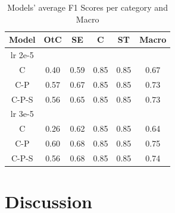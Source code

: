 \documentclass[11pt]{article}
\begin{document}

\begin{table}[ht]
\centering
\begin{tabular}{|c| c c c c | c |}
\hline 
Model & OtC & SE & C & ST & Macro \\
\hline
 lr 2e-5 & & & & &\\
 C     & 0.40	& 0.59  & 0.85	& 0.85 & 0.67 \\
 C-P   & 0.57	& 0.67	& 0.85	& 0.85 & 0.73 \\
 C-P-S & 0.56	& 0.65	& 0.85	& 0.85 & 0.73 \\
 \hline
lr 3e-5 & & & & & \\
 C     & 0.26	& 0.62	&0.85	& 0.85 & 0.64 \\
 C-P   & 0.60	& 0.68	& 0.85	& 0.85 & 0.75 \\
 C-P-S & 0.56	& 0.68	& 0.85	& 0.85 & 0.74 \\
 


 \hline
\end{tabular}
\caption{Models' average F1 Scores per category and Macro}
\label{tab:table 2}
\end{table}





\section{Discussion}
\label{sec:discussion}
\end{document}
